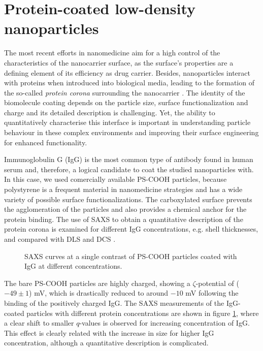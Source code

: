 \section{Protein-coated low-density nanoparticles}
\label{sec:CoatedKiskerExperimental}
The most recent efforts in nanomedicine aim for a high control of the characteristics of the nanocarrier surface, as the surface's properties are a defining element of its efficiency as drug carrier. Besides, nanoparticles interact with proteins when introduced into biological media, leading to the formation of the so-called \emph{protein corona} surrounding the nanocarrier \citep{cedervall_understanding_2007,monopoli_physicalchemical_2011,casals_time_2010}. The identity of the biomolecule coating depends on the particle size, surface functionalization and charge \citep{lundqvist_nanoparticle_2008,tenzer_rapid_2013,gessner_functional_2003} and its detailed description is challenging. Yet, the ability to quantitatively characterise this interface is important in understanding particle behaviour in these complex environments and improving their surface engineering for enhanced functionality.

Immunoglobulin G (IgG) is the most common type of antibody found in human serum and, therefore, a logical candidate to coat the studied nanoparticles with. In this case, we used comercially available PS-COOH particles, because polystyrene is a frequent material in nanomedicine strategies and has a wide variety of possible surface functionalizations. The carboxylated surface prevents the agglomeration of the particles and also provides a chemical anchor for the protein binding. The use of SAXS to obtain a quantitative description of the protein corona is examined for different IgG concentrations, e.g. shell thicknesses, and compared with DLS and DCS \citep{minelli_characterization_2014}.

\begin{figure}
	\centering
		
		\caption[Scattering curves of PS-COOH particles coated with IgG.]{SAXS curves at a single contrast of PS-COOH particles coated with IgG at different concentrations.}
		\label{fig:CoatedKiskerIgGSingleContrastSAXS}
\end{figure}

The bare PS-COOH particles are highly charged, showing a $\zeta$-potential of ($-49 \pm 1$) mV, which is drastically reduced to around $ -10$ mV following the binding of the positively charged IgG. The SAXS measurements of the IgG-coated particles with different protein concentrations are shown in figure \ref{fig:CoatedKiskerIgGSingleContrastSAXS}, where a clear shift to smaller $q$-values is observed for increasing concentration of IgG. This effect is clearly related with the increase in size for higher IgG concentration, although a quantitative description is complicated.

